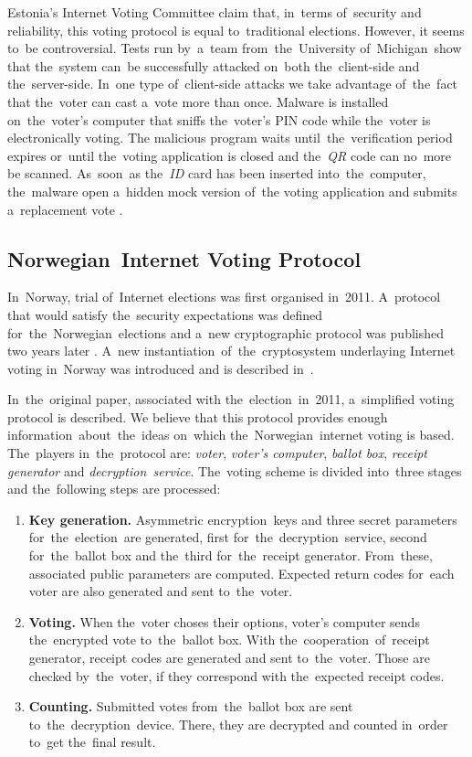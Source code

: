 \bigbreak
Estonia's Internet Voting Committee claim that, in~terms of~security and reliability, this voting protocol is equal to~traditional elections. However, it seems to~be controversial. Tests run by~a~team from~the~University of~Michigan~show that the~system can~be successfully attacked on~both the~client-side and the~server-side. In~one type of~client-side attacks we take advantage of~the~fact that the~voter can cast a~vote more than once. Malware is installed on~the~voter's computer that sniffs the~voter's PIN code while the~voter is electronically voting. The malicious program waits until~the~verification period expires or~until the~voting application is closed and the~\emph{QR} code can no~more be scanned. As~soon~as the~\emph{ID} card has been inserted into~the~computer, the~malware open a~hidden mock version of~the voting application and submits a~replacement vote  \cite{Springall}. 

\subsection{Norwegian~Internet Voting Protocol}
\label{sub:norwegian}
In~Norway, trial of~Internet elections was first organised in~2011. A~protocol that would satisfy the~security expectations was defined for~the~Norwegian~elections \cite{Gjosteen2010} and a~new cryptographic protocol was published two years later \cite{Gjosteen2012}. A~new instantiation~of~the~cryptosystem underlaying Internet voting in~Norway was introduced and is described in~\cite{Gjosteen2015}.

In~the~original paper, associated with the~election~in~2011, a~simplified voting protocol is described. We believe that this protocol provides enough information~about~the~ideas on~which the~Norwegian~internet voting is based. The~players in~the~protocol are: \emph{voter}, \emph{voter's computer}, \emph{ballot box}, \emph{receipt generator} and \emph{decryption~service}. 
\bigbreak
The~voting scheme is divided into~three stages and the~following steps are processed:
\begin{enumerate}
\item \textbf{Key generation.} %
Asymmetric encryption~keys and three secret parameters for~the~election~are generated, first for~the~decryption~service, second for~the~ballot box and the~third for~the~receipt generator. From~these, associated public parameters are computed. Expected return codes for~each voter are also generated and sent to~the~voter.
\item \textbf{Voting.} When the~voter choses their options, voter's computer sends the~encrypted vote to~the~ballot box. With the~cooperation~of~receipt generator, receipt codes are generated and sent to~the~voter. Those are checked by~the~voter, if they correspond with the~expected receipt codes.
\item \textbf{Counting.} Submitted votes from~the~ballot box are sent to~the~decryption~device. There, they are decrypted and counted in~order to~get the~final result.
\end{enumerate}

